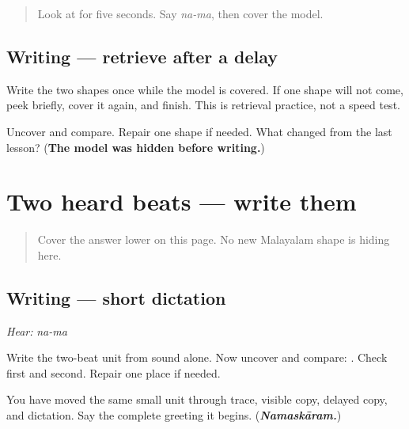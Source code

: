 \begin{quote}
Look at \textbf{} for five seconds. Say \emph{na-ma}, then cover the model.
\end{quote}

\subsection*{Writing — retrieve after a delay}

Write the two shapes once while the model is covered. If one shape will not come, peek briefly, cover it again, and finish. This is retrieval practice, not a speed test.

\begin{tcolorbox}[breakable,colback=teal!4,colframe=teal!35!black,title={Before you move on}]
Uncover \textbf{} and compare. Repair one shape if needed. What changed from the last lesson? (\textbf{The model was hidden before writing.})
\end{tcolorbox}
\section[\texorpdfstring{\ml{നമ} (na-ma)}{നമ (na-ma)}]{Two heard beats — write them}

\label{lesson:ML-W01-na-ma-dictation}



\begin{quote}
Cover the answer lower on this page. No new Malayalam shape is hiding here.
\end{quote}

\subsection*{Writing — short dictation}
\emph{Hear:} \emph{na-ma}

Write the two-beat unit from sound alone. Now uncover and compare: \textbf{}. Check \textbf{} first and \textbf{} second. Repair one place if needed.

\begin{tcolorbox}[breakable,colback=teal!4,colframe=teal!35!black,title={Before you move on}]
You have moved the same small unit through trace, visible copy, delayed copy, and dictation. Say the complete greeting it begins. (\emph{\textbf{Namaskāram.}})
\end{tcolorbox}
